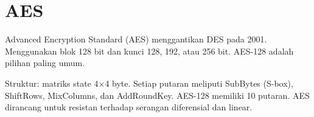 \section{AES}

Advanced Encryption Standard (AES) menggantikan DES pada 2001. Menggunakan blok 128 bit dan kunci 128, 192, atau 256 bit. AES-128 adalah pilihan paling umum.

Struktur: matriks state 4$\times$4 byte. Setiap putaran meliputi SubBytes (S-box), ShiftRows, MixColumns, dan AddRoundKey. AES-128 memiliki 10 putaran. AES dirancang untuk resistan terhadap serangan diferensial dan linear.
